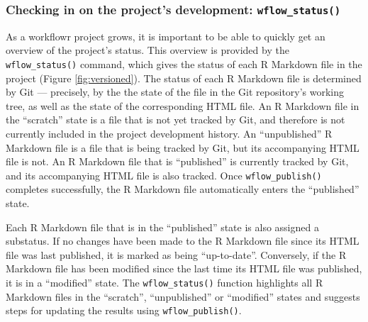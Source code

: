\documentclass[9pt,a4paper]{extarticle}
\begin{document}
\subsubsection*{Checking in on the project's development: \verb|wflow_status()|}

As a workflowr project grows, it is important to be able to quickly get
an overview of the project's status. This overview is provided by the
\verb|wflow_status()| command, which gives the status of each R Markdown file
in the project (Figure \ref{fig:versioned}). The status of each R Markdown file is
determined by Git --- precisely, by the the state of the file in the Git
repository's working tree, as well as the state of the corresponding
HTML file. An R Markdown file in the ``scratch'' state is a file that is
not yet tracked by Git, and therefore is not currently included in the
project development history. An ``unpublished'' R Markdown file is a
file that is being tracked by Git, but its accompanying HTML file is
not. An R Markdown file that is ``published'' is currently tracked by
Git, and its accompanying HTML file is also tracked. Once
\verb|wflow_publish()| completes successfully, the R Markdown file
automatically enters the ``published'' state.

Each R Markdown file that is in the ``published'' state is also assigned
a substatus. If no changes have been made to the R Markdown file since
its HTML file was last published, it is marked as being ``up-to-date''.
Conversely, if the R Markdown file has been modified since the last time
its HTML file was published, it is in a ``modified'' state. The
\verb|wflow_status()| function highlights all R Markdown files in the
``scratch'', ``unpublished'' or ``modified'' states and suggests steps
for updating the results using \verb|wflow_publish()|.
\end{document}
